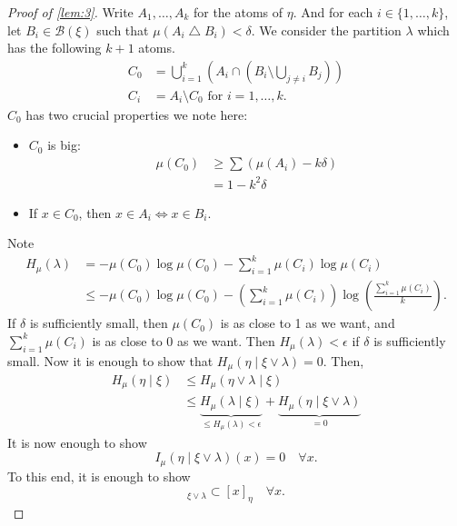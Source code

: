 \documentclass{article}
\newcommand{\sym}{\bigtriangleup}
\begin{document}
\begin{proof}[Proof of \cref{lem:3}]
  Write $A_1, \dotsc, A_k$ for the atoms of $\eta$.
  And for each $i \in \{1, \dotsc, k\}$, let $B_i \in \mathcal{B}(\xi)$ such that $\mu(A_i \sym B_i) < \delta$.
  We consider the partition $\lambda$ which has the following $k+1$ atoms.
  \begin{align*}
    C_0 &= \bigcup_{i=1}^k \left(A_i \cap \left(B_i \setminus \bigcup_{j\neq i} B_j\right)\right) \\
    C_i &= A_i \setminus C_0 \text{ for } i = 1, \dotsc, k.
  \end{align*}
  $C_0$ has two crucial properties we note here:
  \begin{itemize}[label=--]
    \item $C_0$ is big:
      \begin{align*}
        \mu(C_0) &\geq \sum (\mu(A_i) - k \delta) \\
        &= 1 - k^2 \delta
      \end{align*}
    \item If $x \in C_0$, then $x \in A_i \iff x \in B_i$.
  \end{itemize}
  Note
  \begin{align*}
    H_\mu(\lambda) &= -\mu(C_0) \log \mu(C_0) - \sum_{i=1}^k \mu(C_i) \log \mu(C_i) \\
                   &\leq -\mu(C_0) \log \mu(C_0) - \left(\sum_{i=1}^k\mu(C_i) \right) \log\left(\frac{\sum_{i=1}^k \mu(C_i)}{k}\right).
  \end{align*}
  If $\delta$ is sufficiently small, then $\mu(C_0)$ is as close to 1 as we want, and $\sum_{i=1}^k \mu(C_i)$ is as close to 0 as we want.
  Then $H_\mu(\lambda) < \epsilon$ if $\delta$ is sufficiently small.
  Now it is enough to show that $H_\mu(\eta \mid \xi \vee \lambda) = 0$.
  Then,
  \begin{align*}
    H_\mu(\eta \mid \xi) &\leq H_\mu(\eta \vee \lambda \mid \xi) \\
                         &\leq \underbrace{H_\mu(\lambda \mid \xi)}_{\leq H_\mu(\lambda) < \epsilon} + \underbrace{H_\mu(\eta \mid \xi \vee \lambda)}_{=0}
  \end{align*}
  It is now enough to show
  \begin{equation*}
    I_\mu(\eta \mid \xi \vee \lambda)(x) = 0 \quad \forall x.
  \end{equation*}
  To this end, it is enough to show
  \begin{equation*}
    [x]_{\xi \vee \lambda} \subset [x]_\eta \quad \forall x.

\end{equation*}
\end{proof}
\end{document}
